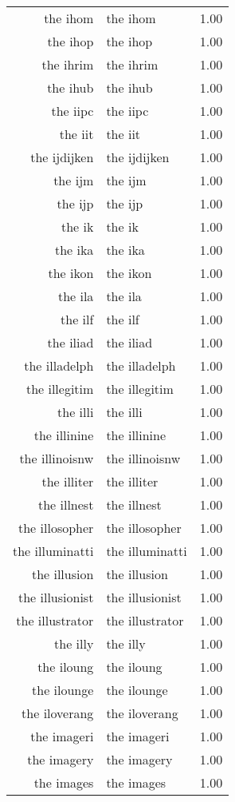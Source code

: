 \begin{table}[ht]
\begin{tabular}{rlr}
  the ihom & the ihom & 1.00 \\ 
  the ihop & the ihop & 1.00 \\ 
  the ihrim & the ihrim & 1.00 \\ 
  the ihub & the ihub & 1.00 \\ 
  the iipc & the iipc & 1.00 \\ 
  the iit & the iit & 1.00 \\ 
  the ijdijken & the ijdijken & 1.00 \\ 
  the ijm & the ijm & 1.00 \\ 
  the ijp & the ijp & 1.00 \\ 
  the ik & the ik & 1.00 \\ 
  the ika & the ika & 1.00 \\ 
  the ikon & the ikon & 1.00 \\ 
  the ila & the ila & 1.00 \\ 
  the ilf & the ilf & 1.00 \\ 
  the iliad & the iliad & 1.00 \\ 
  the illadelph & the illadelph & 1.00 \\ 
  the illegitim & the illegitim & 1.00 \\ 
  the illi & the illi & 1.00 \\ 
  the illinine & the illinine & 1.00 \\ 
  the illinoisnw & the illinoisnw & 1.00 \\ 
  the illiter & the illiter & 1.00 \\ 
  the illnest & the illnest & 1.00 \\ 
  the illosopher & the illosopher & 1.00 \\ 
  the illuminatti & the illuminatti & 1.00 \\ 
  the illusion & the illusion & 1.00 \\ 
  the illusionist & the illusionist & 1.00 \\ 
  the illustrator & the illustrator & 1.00 \\ 
  the illy & the illy & 1.00 \\ 
  the iloung & the iloung & 1.00 \\ 
  the ilounge & the ilounge & 1.00 \\ 
  the iloverang & the iloverang & 1.00 \\ 
  the imageri & the imageri & 1.00 \\ 
  the imagery & the imagery & 1.00 \\ 
  the images & the images & 1.00 \\ 

\end{tabular}
\end{table}
